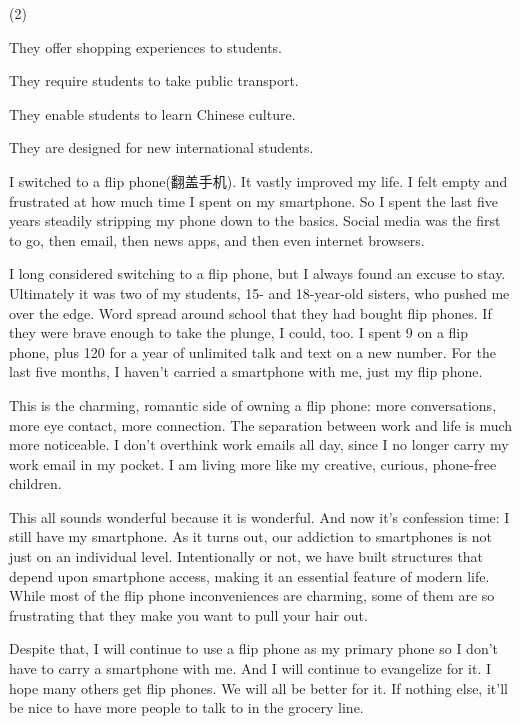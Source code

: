 \documentclass{英语试卷}
\begin{document}
\begin{choices}(2)
  \item They offer shopping experiences to students.
  \item They require students to take public transport.
  \item They enable students to learn Chinese culture.
  \item They are designed for new international students.
\end{choices}
\par I switched to a flip phone(翻盖手机). It vastly improved my life. I felt empty and frustrated at how much time I spent on my smartphone. So I spent the last five years steadily stripping my phone down to the basics. Social media was the first to go, then email, then news apps, and then even internet browsers.\par
\par I long considered switching to a flip phone, but I always found an excuse to stay. Ultimately it was two of my students, 15- and 18-year-old sisters, who pushed me over the edge. Word spread around school that they had bought flip phones. If they were brave enough to take the plunge, I could, too. I spent 9 on a flip phone, plus 120 for a year of unlimited talk and text on a new number. For the last five months, I haven't carried a smartphone with me, just my flip phone.\par
\par This is the charming, romantic side of owning a flip phone: more conversations, more eye contact, more connection. The separation between work and life is much more noticeable. I don't overthink work emails all day, since I no longer carry my work email in my pocket. I am living more like my creative, curious, phone-free children.\par
\par This all sounds wonderful because it is wonderful. And now it's confession time: I still have my smartphone. As it turns out, our addiction to smartphones is not just on an individual level. Intentionally or not, we have built structures that depend upon smartphone access, making it an essential feature of modern life. While most of the flip phone inconveniences are charming, some of them are so frustrating that they make you want to pull your hair out.\par
\par Despite that, I will continue to use a flip phone as my primary phone so I don't have to carry a smartphone with me. And I will continue to evangelize for it. I hope many others get flip phones. We will all be better for it. If nothing else, it'll be nice to have more people to talk to in the grocery line.\par
\end{document}
